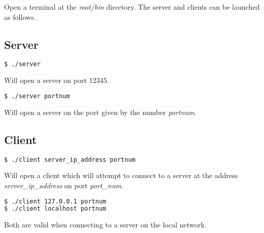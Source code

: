 Open a terminal at the \textit{root/bin} directory. The server and clients can be launched as follows.
\subsection{Server}
\begin{lstlisting}[language=bash]
$ ./server
\end{lstlisting}
Will open a server on port 12345.
\begin{lstlisting}[language=bash]
$ ./server portnum
\end{lstlisting}
Will open a server on the port given by the number \textit{portnum}.
\\
\subsection{Client}
\begin{lstlisting}[language=bash]
$ ./client server_ip_address portnum
\end{lstlisting}
Will open a client which will attempt to connect to a server at the address \textit{server\_ip\_address} on port \textit{port\_num}.
\begin{lstlisting}[language=bash]
$ ./client 127.0.0.1 portnum
$ ./client localhost portnum
\end{lstlisting}
Both are valid when connecting to a server on the local network. 